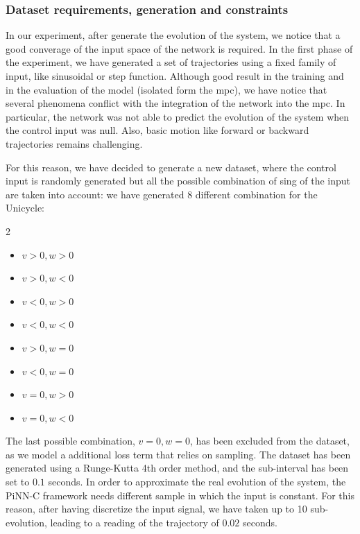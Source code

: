 \subsubsection{Dataset requirements, generation and constraints}

In our experiment, after generate the evolution of the system, we notice that a good converage of the input space of the network is required.
In the first phase of the experiment, we have generated a set of trajectories using a fixed family of input, like sinusoidal or step function. 
Although good result in the training and in the evaluation of the model (isolated form the mpc), we have notice that several phenomena conflict with the integration of the network into the mpc.
In particular, the network was not able to predict the evolution of the system when the control input was null. Also, basic motion like forward or backward trajectories remains challenging.

For this reason, we have decided to generate a new dataset, where the control input is randomly generated but all the possible combination of sing of the input are taken into account:
we have generated 8 different combination for the Unicycle:
\begin{multicols}{2}
    \begin{itemize}
        \centering
        \item $v > 0, w > 0$
        \item $v > 0, w < 0$
        \item $v < 0, w > 0$
        \item $v < 0, w < 0$
        \item $v > 0, w = 0$ 
        \item $v < 0, w = 0$
        \item $v = 0, w > 0$
        \item $v = 0, w < 0$
    \end{itemize}
\end{multicols}

The last possible combination, $v = 0, w = 0$, has been excluded from the dataset, as we model a additional loss term that relies on sampling.
The dataset has been generated using a Runge-Kutta 4th order method, and the sub-interval has been set to $0.1$ seconds. In order to approximate the real evolution of the system, 
the PiNN-C framework needs different sample in which the input is constant. For this reason, after having discretize the input signal, we have taken up to 10 sub-evolution, leading to a reading of the trajectory of $0.02$ seconds.


